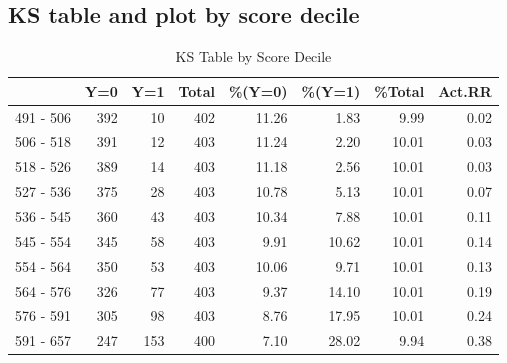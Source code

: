 \documentclass[a4paper]{article}
\begin{document}
\subsection{KS table and plot by score decile} 
\begin{table}[ht]
\begin{center}
\begin{tabular}{rrrrrrrr}
  \hline
 & Y=0 & Y=1 & Total & \%(Y=0) & \%(Y=1) & \%Total & Act.RR \\ 
  \hline
491 - 506 & 392 & 10 & 402 & 11.26 & 1.83 & 9.99 & 0.02 \\ 
  506 - 518 & 391 & 12 & 403 & 11.24 & 2.20 & 10.01 & 0.03 \\ 
  518 - 526 & 389 & 14 & 403 & 11.18 & 2.56 & 10.01 & 0.03 \\ 
  527 - 536 & 375 & 28 & 403 & 10.78 & 5.13 & 10.01 & 0.07 \\ 
  536 - 545 & 360 & 43 & 403 & 10.34 & 7.88 & 10.01 & 0.11 \\ 
  545 - 554 & 345 & 58 & 403 & 9.91 & 10.62 & 10.01 & 0.14 \\ 
  554 - 564 & 350 & 53 & 403 & 10.06 & 9.71 & 10.01 & 0.13 \\ 
  564 - 576 & 326 & 77 & 403 & 9.37 & 14.10 & 10.01 & 0.19 \\ 
  576 - 591 & 305 & 98 & 403 & 8.76 & 17.95 & 10.01 & 0.24 \\ 
  591 - 657 & 247 & 153 & 400 & 7.10 & 28.02 & 9.94 & 0.38 \\ 
   \hline
\end{tabular}
\caption{KS Table by Score Decile}
\end{center}
\end{table}
\end{document}
